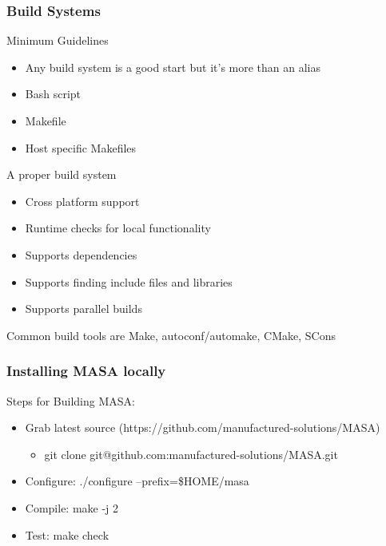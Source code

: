 \documentclass[mathserif]{beamer}
\begin{document}
%
%
%
\begin{frame}
\frametitle{Build Systems}

\begin{block}{Minimum Guidelines} 
\begin{itemize}
\item Any build system is a good start but it's more than an alias
\item Bash script
\item Makefile
\item Host specific Makefiles
\end{itemize}
\end{block}

\begin{block}{A proper build system}
\begin{itemize}
\item Cross platform support
\item Runtime checks for local functionality
\item Supports dependencies
\item Supports finding include files and libraries
\item Supports parallel builds
\end{itemize}
\end{block}

{\color{pecos2} Common build tools are Make, autoconf/automake,  CMake, SCons}
\end{frame}

%
%
%
\begin{frame}
  \frametitle{Installing MASA locally}
  \begin{block}{Steps for Building MASA:}
    \begin{itemize}
      \item Grab latest source (https://github.com/manufactured-solutions/MASA)
	    \begin{itemize}
	     \item git clone git@github.com:manufactured-solutions/MASA.git
	    \end{itemize}
      \item Configure: ./configure --prefix=\$HOME/masa %
      \item Compile: make -j 2
      \item Test: make check
     \end{itemize}
   \end{block}
\begin{center}
\small
{}
\end{center}

\end{frame}
\end{document}
